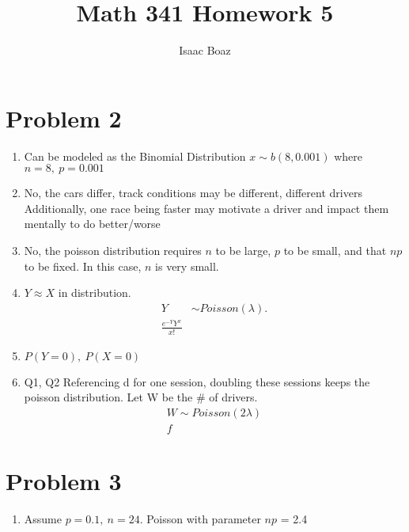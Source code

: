 \documentclass{article}
\title{Math 341 Homework 5}
\author{Isaac Boaz}
\begin{document}
\maketitle

\section*{Problem 2}
\begin{enumerate}[label=\alph*)]
    \item Can be modeled as the Binomial Distribution \(x \sim b(8, 0.001)\) where \(n = 8,\ p = 0.001\)
    \item No, the cars differ, track conditions may be different, different drivers
          Additionally, one race being faster may motivate a driver and impact them mentally to do better/worse
    \item No, the poisson distribution requires \(n\) to be large, \(p\) to be small, and that \(np\) to be fixed. In this case, \(n\) is very small.
    \item \(Y \approx X\) in distribution.
          \begin{align*}
              Y & \sim Poisson(\lambda). \\
              \frac{e^{-Y}Y^x}{x!}
          \end{align*}
    \item \(P(Y = 0),\ P(X = 0)\) %
    \item Q1, Q2
          Referencing d for one session, doubling these sessions keeps the poisson distribution.
          Let W be the \# of drivers.
          \begin{align*}
              W \sim Poisson(2\lambda) \\
              f
          \end{align*}
\end{enumerate}

\section*{Problem 3}
\begin{enumerate}[label=\alph*)]
    \item Assume \(p = 0.1,\ n = 24\). Poisson with parameter \(np\) = 2.4
\end{enumerate}
\end{document}
